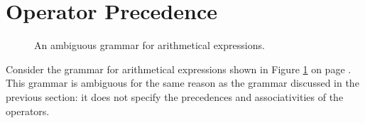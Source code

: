 \section{Operator Precedence \label{section:operator-precedence}}

\begin{figure}[!ht]
  \begin{center}    
  \end{center}
  \caption{An ambiguous grammar for arithmetical expressions.}
  \label{fig:grammar-resolved.g}
\end{figure}

\noindent
Consider the grammar for arithmetical expressions shown in Figure \ref{fig:grammar-resolved.g} on page
\pageref{fig:grammar-resolved.g}.  This grammar is ambiguous for the same reason as the grammar discussed in
the previous section: it does not specify the precedences and associativities of the operators.

